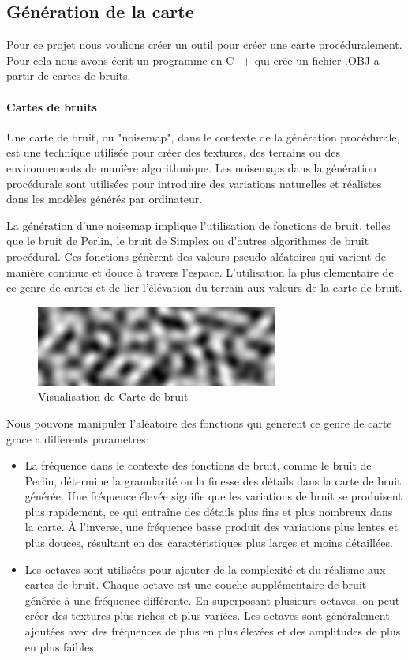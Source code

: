 

\subsection{Génération de la carte}
    Pour ce projet nous voulions créer un outil pour créer une carte procéduralement. Pour cela nous avons écrit un programme en C++ qui crée un fichier .OBJ a partir de cartes de bruits.
    \paragraph{Cartes de bruits}
    Une carte de bruit, ou "noisemap", dans le contexte de la génération procédurale, est une technique utilisée pour créer des textures, des terrains ou des environnements de manière algorithmique. Les noisemaps dans la génération procédurale sont utilisées pour introduire des variations naturelles et réalistes dans les modèles générés par ordinateur.
    
    La génération d'une noisemap implique l'utilisation de fonctions de bruit, telles que le bruit de Perlin, le bruit de Simplex ou d'autres algorithmes de bruit procédural. Ces fonctions génèrent des valeurs pseudo-aléatoires qui varient de manière continue et douce à travers l'espace. L'utilisation la plus elementaire de ce genre de cartes et de lier l'élévation du terrain aux valeurs de la carte de bruit.

    \begin{figure}[!h]
        \centering
            \includegraphics[width=0.5\linewidth]{images/render-noise.png}
            \caption{Visualisation de Carte de bruit}
            \label{fig:enter-label}
    \end{figure}

    Nous pouvons manipuler l'aléatoire des fonctions qui generent ce genre de carte grace a differents parametres:
    \begin{itemize}
        \item La fréquence dans le contexte des fonctions de bruit, comme le bruit de Perlin, détermine la granularité ou la finesse des détails dans la carte de bruit générée. Une fréquence élevée signifie que les variations de bruit se produisent plus rapidement, ce qui entraîne des détails plus fins et plus nombreux dans la carte. À l'inverse, une fréquence basse produit des variations plus lentes et plus douces, résultant en des caractéristiques plus larges et moins détaillées.
        \item Les octaves sont utilisées pour ajouter de la complexité et du réalisme aux cartes de bruit. Chaque octave est une couche supplémentaire de bruit générée à une fréquence différente. En superposant plusieurs octaves, on peut créer des textures plus riches et plus variées. Les octaves sont généralement ajoutées avec des fréquences de plus en plus élevées et des amplitudes de plus en plus faibles.
    \end{itemize}

